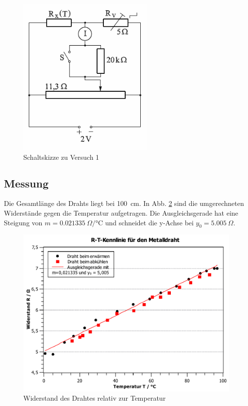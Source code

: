 \documentclass[11pt,a4paper,titlepage, ngerman]{article}
\begin{document}
			\begin{figure}
				\centering
				\includegraphics[width=0.6\textwidth]{Versuch2.png}
				\caption{Schaltskizze zu Versuch 1}
				\label{Schaltskizze2}
			\end{figure}
		
		\subsection{Messung}
			
			Die Gesamtlänge des Drahts liegt bei \SI{100}{cm}. In Abb. \ref{fig:drahtRT} sind die umgerechneten Widerstände gegen die Temperatur aufgetragen. Die Ausgleichsgerade hat eine Steigung von $m = \SI{0,021335}{\Omega\per\celsius}$ und schneidet die y-Achse bei $y_0 = \SI{5,005}{\Omega}$.
			
			\begin{figure}
				\centering
				\includegraphics[width=\textwidth]{KennlinieDrahtRT.pdf}
				\caption{Widerstand des Drahtes relativ zur Temperatur}
				\label{fig:drahtRT}
			\end{figure}
			
\end{document}
